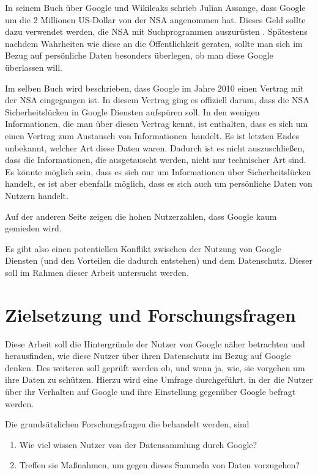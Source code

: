 In seinem Buch über Google und Wikileaks schrieb Julian Assange, dass Google um die 2 Millionen US-Dollar von der NSA angenommen hat. Dieses Geld sollte dazu verwendet werden, die NSA mit Suchprogrammen auszurüsten \cite{assangebook}. Spätestens nachdem Wahrheiten wie diese an die Öffentlichkeit geraten, sollte man sich im Bezug auf persönliche Daten besonders überlegen, ob man diese Google überlassen will.

Im selben Buch wird beschrieben, dass Google im Jahre 2010 einen Vertrag mit der NSA eingegangen ist. In diesem Vertrag ging es offiziell darum, dass die NSA Sicherheitslücken in Google Diensten aufspüren soll. In den wenigen Informationen, die man über diesen Vertrag kennt, ist enthalten, dass es sich um einen Vertrag zum \glqq Austausch von Informationen\grqq\ handelt. Es ist letzten Endes unbekannt, welcher Art diese Daten waren. Dadurch ist es nicht auszuschließen, dass die Informationen, die ausgetauscht werden, nicht nur technischer Art sind. Es könnte möglich sein, dass es sich nur um Informationen über Sicherheitslücken handelt, es ist aber ebenfalls möglich, dass es sich auch um persönliche Daten von Nutzern handelt.

Auf der anderen Seite zeigen die hohen Nutzerzahlen, dass Google kaum gemieden wird.

Es gibt also einen potentiellen Konflikt zwischen der Nutzung von Google Diensten (und den Vorteilen die dadurch entstehen) und dem Datenschutz. Dieser soll im Rahmen dieser Arbeit untersucht werden.

\section{Zielsetzung und Forschungsfragen}
\label{sec:questions}
Diese Arbeit soll die Hintergründe der Nutzer von Google näher betrachten und herausfinden, wie diese Nutzer über ihren Datenschutz im Bezug auf Google denken. Des weiteren soll geprüft werden ob, und wenn ja, wie, sie vorgehen um ihre Daten zu schützen. Hierzu wird eine Umfrage durchgeführt, in der die Nutzer über ihr Verhalten auf Google und ihre Einstellung gegenüber Google befragt werden.

Die grundsätzlichen Forschungsfragen die behandelt werden, sind
\begin{enumerate}
\item Wie viel wissen Nutzer von der Datensammlung durch Google?
\item Treffen sie Maßnahmen, um gegen dieses Sammeln von Daten vorzugehen?
\end{enumerate}